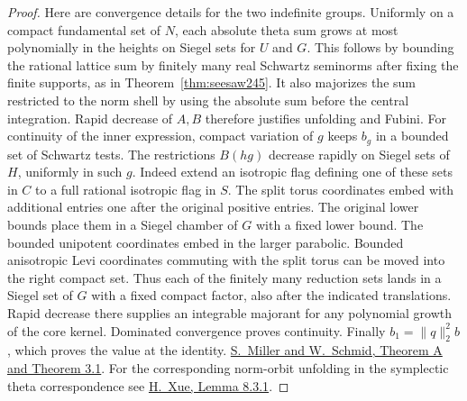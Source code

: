\documentclass[a4paper,11pt]{article}
\theoremstyle{definition}
\theoremstyle{remark}
\numberwithin{equation}{section}
\begin{document}
\begin{proof}
Here are convergence details for the two indefinite groups.
Uniformly on a compact fundamental set of \(N\), each absolute
theta sum grows at most polynomially in the heights on Siegel
sets for \(U\) and \(G\). This follows by bounding the rational
lattice sum by finitely many real Schwartz seminorms after
fixing the finite supports, as in Theorem~\ref{thm:seesaw245}.
It also majorizes the sum restricted to the norm shell by using
the absolute sum before the central integration. Rapid decrease
of \(A,B\) therefore justifies unfolding and Fubini. For continuity
of the inner expression, compact variation of \(g\) keeps \(b_g\)
in a bounded set of Schwartz tests. The restrictions \(B(hg)\)
decrease rapidly on Siegel sets of \(H\), uniformly in such \(g\).
Indeed extend an isotropic flag defining one of these sets in
\(C\) to a full rational isotropic flag in \(S\). The split torus
coordinates embed with additional entries one after the original
positive entries. The original lower bounds place them in a
Siegel chamber of \(G\) with a fixed lower bound. The bounded
unipotent coordinates embed in the larger parabolic. Bounded
anisotropic Levi coordinates commuting with the split torus
can be moved into the right compact set. Thus each of the
finitely many reduction sets lands in a Siegel set of \(G\)
with a fixed compact factor, also after the indicated translations.
Rapid decrease there supplies an integrable majorant for any
polynomial growth of the core kernel. Dominated convergence
proves continuity. Finally \(b_1=\|q\|_2^2 b\), which proves
the value at the identity.
\href{https://arxiv.org/abs/1106.2149}{S.~Miller and W.~Schmid,
Theorem A and Theorem 3.1}. For the corresponding norm-orbit unfolding in the
symplectic theta correspondence see
\href{https://archive.math.arizona.edu/xuehang/refinedFJ.pdf}
{H.~Xue, Lemma 8.3.1}.
\end{proof}
\end{document}
